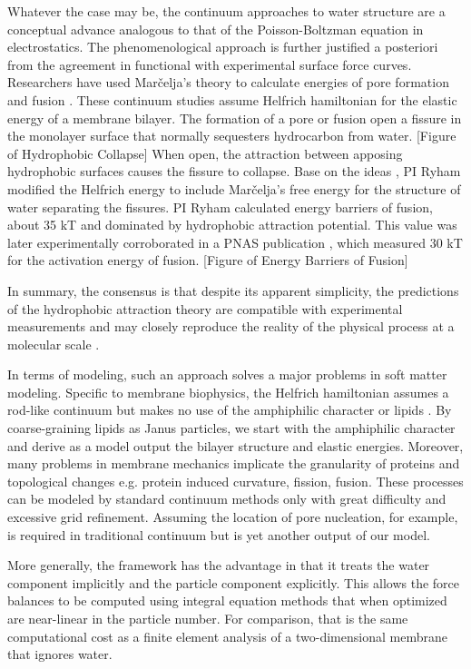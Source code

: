 Whatever the case may be, 
the continuum approaches to water structure are a conceptual advance 
analogous to that of the Poisson-Boltzman equation in electrostatics. 
The phenomenological approach is further justified a posteriori from 
the agreement in functional with
experimental surface force curves.
Researchers have used  Mar\v{c}elja's theory to calculate
energies of pore formation and fusion \cite{Gletal87, Aketal17,RyKlYaCo16}. 
These continuum studies assume Helfrich hamiltonian for the elastic energy of a
membrane bilayer.  The formation of a pore or fusion open a fissure in the monolayer
surface that normally sequesters hydrocarbon from water.  
[Figure of Hydrophobic Collapse]
When open, the attraction between apposing hydrophobic surfaces causes the 
fissure to collapse.  Base on the ideas  \cite{Gletal87}, PI Ryham \cite{RyKlYaCo16} 
modified the Helfrich energy to include Mar\v{c}elja's free energy for the structure of 
water separating the fissures.  PI Ryham calculated energy barriers of fusion, 
about 35 kT and dominated by hydrophobic attraction potential. 
This value was later experimentally corroborated in a 
PNAS publication \cite{Fr-MaRoPi16}, which measured 30 kT for the activation
energy of fusion.  
[Figure of Energy Barriers of Fusion]

In summary, the consensus is that despite its apparent simplicity, the predictions
of the hydrophobic attraction theory are compatible with experimental measurements and 
may closely reproduce the reality of the physical process at a molecular 
scale \cite{Fr-MaRoPi16}.

In terms of modeling, such an approach solves a major problems in soft matter modeling.
Specific to membrane biophysics, the Helfrich hamiltonian assumes a rod-like continuum
but makes no use of the amphiphilic character or lipids \cite{HaKo00, Deserno, Akimov}.  
By coarse-graining lipids as Janus particles, we start with the amphiphilic character
and derive as a model output the bilayer structure and elastic energies.
Moreover, many problems in membrane mechanics implicate the granularity of 
proteins and topological changes e.g. protein induced curvature, fission, fusion.  
These processes can be modeled by standard continuum methods only with
great difficulty and excessive grid refinement.  Assuming the location of pore nucleation,
for example, is required in traditional continuum but is yet another output of our model. 

More generally, the framework has the advantage in that it treats the water component implicitly 
and the particle component explicitly.  This allows the force balances to be 
computed using integral equation methods that 
when optimized are near-linear in the particle number. 
For comparison,  that is the same computational cost as a finite element
analysis of a two-dimensional membrane that ignores water.



